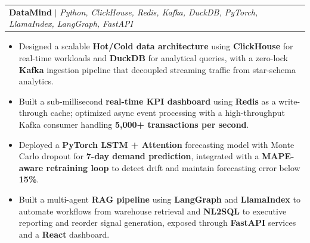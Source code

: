 \documentclass[letterpaper,11pt]{article}
\makeatletter
\newcommand{\resumeItem}[1]{
  \item\small{{#1 \vspace{-1pt}}}
}
\newcommand{\resumeProjectHeading}[2]{
    \item
    \begin{tabular*}{1.001\textwidth}{l@{\extracolsep{\fill}}r}
      \small#1 & \textbf{\small #2}\\
    \end{tabular*}\vspace{-5pt}
}
\newcommand{\resumeItemListStart}{\begin{itemize}}
\newcommand{\resumeItemListEnd}{\end{itemize}\vspace{-9pt}}
\makeatother
\begin{document}

    \resumeProjectHeading
  {\textbf{DataMind} $|$ \emph{Python, ClickHouse, Redis, Kafka, DuckDB, PyTorch, LlamaIndex, LangGraph, FastAPI}}
  {\href{https://github.com/arjeetanand/datamind}{\faGithub}}
\resumeItemListStart
  \resumeItem{Designed a scalable \textbf{Hot/Cold data architecture} using \textbf{ClickHouse} for real-time workloads and \textbf{DuckDB} for analytical queries, with a zero-lock \textbf{Kafka} ingestion pipeline that decoupled streaming traffic from star-schema analytics.}
  \resumeItem{Built a sub-millisecond \textbf{real-time KPI dashboard} using \textbf{Redis} as a write-through cache; optimized async event processing with a high-throughput Kafka consumer handling \textbf{5,000+ transactions per second}.}
  \resumeItem{Deployed a \textbf{PyTorch LSTM + Attention} forecasting model with Monte Carlo dropout for \textbf{7-day demand prediction}, integrated with a \textbf{MAPE-aware retraining loop} to detect drift and maintain forecasting error below \textbf{15\%}.}
  \resumeItem{Built a multi-agent \textbf{RAG pipeline} using \textbf{LangGraph} and \textbf{LlamaIndex} to automate workflows from warehouse retrieval and \textbf{NL2SQL} to executive reporting and reorder signal generation, exposed through \textbf{FastAPI} services and a \textbf{React} dashboard.}
\resumeItemListEnd
\vspace{-3pt}
    
\end{document}
